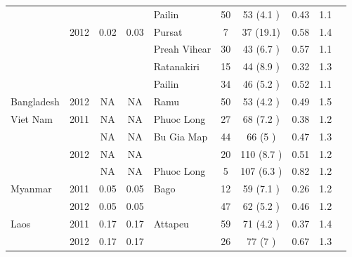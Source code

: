 \documentclass[9pt,lineno]{elife}
\begin{document}
\begin{table}[btp]
{\begin{tabular}{p{1.5cm} c c c |p{1.5cm} c c c c c}
                &               &               &               &Pailin&50   &53   (4.1 )&0.43 &1.1  &\\
                &2012           &0.02  &0.03  &Pursat&7    &37   (19.1)&0.58 &1.4  &\\
                &               &               &               &Preah Vihear&30   &43   (6.7 )&0.57 &1.1  &\\
                &               &               &               &Ratanakiri&15   &44   (8.9 )&0.32 &1.3  &\\
                &               &               &               &Pailin&34   &46   (5.2 )&0.52 &1.1  &\\
\hline
Bangladesh      &2012           &NA    &NA    &Ramu &50   &53   (4.2 )&0.49 &1.5  &\\
\hline
Viet Nam        &2011           &NA    &NA    &Phuoc Long&27   &68   (7.2 )&0.38 &1.2  &\\
                &               &NA    &NA    &Bu Gia Map&44   &66   (5   )&0.47 &1.3  &\\
                &2012           &NA    &NA    &               &20   &110  (8.7 )&0.51 &1.2  &\\
                &               &NA    &NA    &Phuoc Long&5    &107  (6.3 )&0.82 &1.2  &\\
\hline
Myanmar         &2011           &0.05  &0.05  &Bago &12   &59   (7.1 )&0.26 &1.2  &\\
                &2012           &0.05  &0.05  &               &47   &62   (5.2 )&0.46 &1.2  &\\
\hline
Laos            &2011           &0.17  &0.17  &Attapeu&59   &71   (4.2 )&0.37 &1.4  &\\
                &2012           &0.17  &0.17  &               &26   &77   (7   )&0.67 &1.3  &\\
\hline
\bottomrule
\end{tabular}
}

\end{table}
\end{document}
